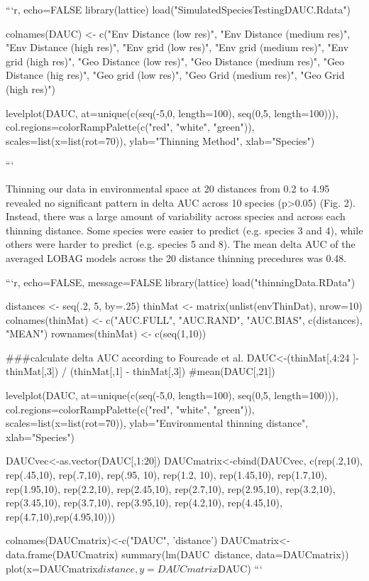 ```{r, echo=FALSE}
library(lattice)
load("SimulatedSpeciesTestingDAUC.Rdata")

colnames(DAUC) <- c("Env Distance (low res)", "Env Distance (medium res)", "Env Distance (high res)", 
    "Env grid (low res)", "Env grid (medium res)", "Env grid (high res)", 
    "Geo Distance (low res)", "Geo Distance (medium res)", "Geo Distance (hig res)", 
    "Geo grid (low res)", "Geo Grid (medium res)", "Geo Grid (high res)")

levelplot(DAUC, at=unique(c(seq(-5,0, length=100), seq(0,5, length=100))), col.regions=colorRampPalette(c("red", "white", "green")), scales=list(x=list(rot=70)), ylab="Thinning Method", xlab="Species")

```

Thinning our data in environmental space at 20 distances from 0.2 to 4.95 revealed no significant pattern in delta AUC across 10 species (p>0.05) (Fig. 2). Instead, there was a large amount of variability across species and across each thinning distance. Some species were easier to predict (e.g. species 3 and 4), while others were harder to predict (e.g. species 5 and 8). The mean delta AUC of the averaged LOBAG models across the 20 distance thinning precedures was 0.48. 

```{r, echo=FALSE, message=FALSE}
library(lattice)
load("thinningData.RData")

distances <- seq(.2, 5, by=.25)
thinMat <- matrix(unlist(envThinDat), nrow=10)
colnames(thinMat) <- c("AUC.FULL", "AUC.RAND", "AUC.BIAS", c(distances), "MEAN")
rownames(thinMat) <- c(seq(1,10))

###calculate delta AUC according to Fourcade et al. 
DAUC<-(thinMat[,4:24 ]-thinMat[,3]) / (thinMat[,1] - thinMat[,3])
#mean(DAUC[,21])

levelplot(DAUC, at=unique(c(seq(-5,0, length=100), seq(0,5, length=100))), col.regions=colorRampPalette(c("red", "white", "green")), scales=list(x=list(rot=70)), ylab="Environmental thinning distance", xlab="Species")

DAUCvec<-as.vector(DAUC[,1:20])
DAUCmatrix<-cbind(DAUCvec, c(rep(.2,10), rep(.45,10), rep(.7,10), rep(.95, 10), rep(1.2, 10), rep(1.45,10), rep(1.7,10), rep(1.95,10), rep(2.2,10), rep(2.45,10), rep(2.7,10), rep(2.95,10), rep(3.2,10), rep(3.45,10), rep(3.7,10), rep(3.95,10), rep(4.2,10), rep(4.45,10), rep(4.7,10),rep(4.95,10)))

colnames(DAUCmatrix)<-c("DAUC", 'distance')
DAUCmatrix<-data.frame(DAUCmatrix)
summary(lm(DAUC~distance, data=DAUCmatrix))
plot(x=DAUCmatrix$distance, y=DAUCmatrix$DAUC)
```

